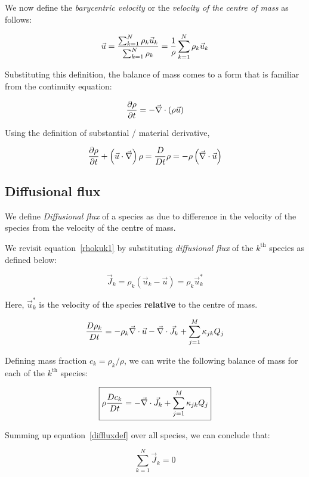 We now define the {\em barycentric velocity} or the {\em velocity of the centre
of mass} as follows:

$$ \vec{u} = { \sum_{k=1}^{N}{\rho_k \vec{u}_k} \over \sum_{k=1}^{N}{\rho_k}} =
{1 \over \rho} \sum_{k=1}^{N}{\rho_k \vec{u}_k} $$

Substituting this definition, the balance of mass comes to a form that is
familiar from the continuity equation:

$$ {\partial \rho \over \partial t}  = - \vec{\nabla} \cdot \left( \rho \vec{u}
\right) $$

Using the definition of substantial / material derivative,

$$ {\partial \rho \over \partial t} + \left( \vec{u} \cdot \vec{\nabla} \right) \rho 
= {D \over Dt} \rho =  - \rho \left( \vec{\nabla} \cdot \vec{u} \right) $$

\subsection{Diffusional flux}

We define {\it Diffusional flux} of a species as due to difference in the
velocity of the species from the velocity of the centre of mass.

We revisit equation~\ref{rhokuk1} by substituting {\em diffusional flux} of the
$k^\text{th}$ species as defined below:

\begin{equation}
 \label{diffluxdef}
\boxed{
\vec{J}_k = \rho_k \left( \vec{u}_k - \vec{u} \right) = \rho_k \vec{u}^*_k
}
\end{equation}


Here, $\vec{u}^*_k$ is the velocity of the species {\bf relative} to the centre of mass.


$$ {D \rho_k \over D t} = - \rho_k \vec{\nabla} \cdot \vec{u} - \vec{\nabla} \cdot
\vec{J}_k + \sum_{j=1}^{M}{ \kappa_{jk} Q_j } $$

Defining mass fraction $c_k = {\rho_k / \rho}$, we can write the following
balance of mass for each of the $k^\text{th}$ species:

\begin{equation}
 \label{mconv1}
\boxed{
\rho {D c_k \over D t} = - \vec{\nabla} \cdot \vec{J}_k + \sum_{j=1}^{M}{ \kappa_{jk}
Q_j } 
}
\end{equation}

Summing up equation~\ref{diffluxdef} over all species, we can conclude that:

$$ \sum_{k=1}^{N}{\vec{J}_k} = 0 $$

